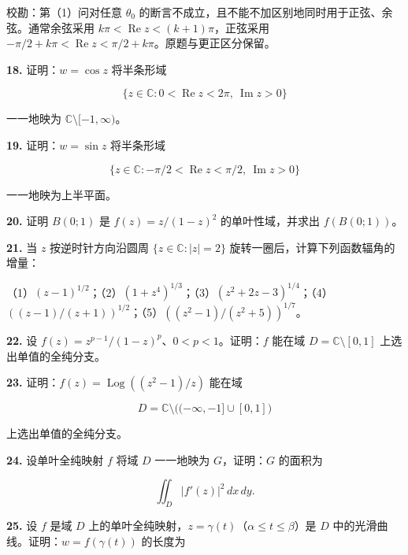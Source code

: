 \documentclass[11pt,a4paper]{article}
\begin{document}
校勘：第（1）问对任意 \(\theta_0\)
的断言不成立，且不能不加区别地同时用于正弦、余弦。通常余弦采用
\(k\pi<\operatorname{Re}z<(k+1)\pi\)，正弦采用
\(-\pi/2+k\pi<\operatorname{Re}z<\pi/2+k\pi\)。原题与更正区分保留。

\par{}
\noindent\textbf{18.} 证明：\(w=\cos z\) 将半条形域

\[
\{z\in\mathbb C:0<\operatorname{Re}z<2\pi,\ \operatorname{Im}z>0\}
\]

一一地映为 \(\mathbb C\setminus[-1,\infty)\)。

\par{}
\noindent\textbf{19.} 证明：\(w=\sin z\) 将半条形域

\[
\{z\in\mathbb C:-\pi/2<\operatorname{Re}z<\pi/2,\ \operatorname{Im}z>0\}
\]

一一地映为上半平面。

\par{}
\noindent\textbf{20.} 证明 \(B(0;1)\) 是 \(f(z)=z/(1-z)^2\) 的单叶性域，并求出
\(f(B(0;1))\)。

\par{}
\noindent\textbf{21.} 当 \(z\) 按逆时针方向沿圆周 \(\{z\in\mathbb C:|z|=2\}\)
旋转一圈后，计算下列函数辐角的增量：

（1）\((z-1)^{1/2}\)；（2）\((1+z^4)^{1/3}\)；（3）\((z^2+2z-3)^{1/4}\)；（4）\(((z-1)/(z+1))^{1/2}\)；（5）\(((z^2-1)/(z^2+5))^{1/7}\)。

\par{}
\noindent\textbf{22.} 设 \(f(z)=z^{p-1}/(1-z)^p\)、\(0<p<1\)。证明：\(f\) 能在域
\(D=\mathbb C\setminus[0,1]\) 上选出单值的全纯分支。

\par{}
\noindent\textbf{23.} 证明：\(f(z)=\operatorname{Log}((z^2-1)/z)\) 能在域

\[
D=\mathbb C\setminus\bigl((-\infty,-1]\cup[0,1]\bigr)
\]

上选出单值的全纯分支。

\par{}
\noindent\textbf{24.} 设单叶全纯映射 \(f\) 将域 \(D\) 一一地映为
\(G\)，证明：\(G\) 的面积为

\[
\iint_D|f'(z)|^2\,dx\,dy.
\]

\par{}
\noindent\textbf{25.} 设 \(f\) 是域 \(D\)
上的单叶全纯映射，\(z=\gamma(t)\)（\(\alpha\le t\le\beta\)）是 \(D\)
中的光滑曲线。证明：\(w=f(\gamma(t))\) 的长度为
\end{document}
